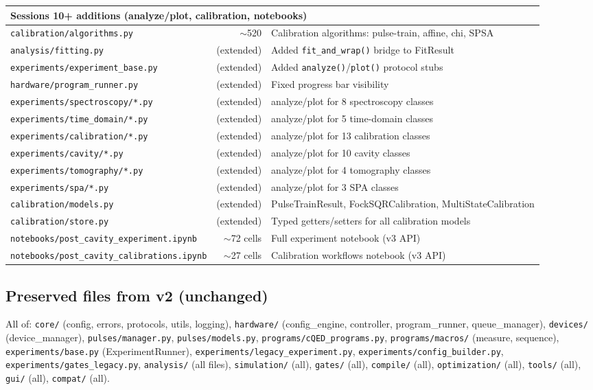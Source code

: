 \documentclass[11pt]{article}
\begin{document}
\begin{longtable}{lrl}
\midrule
\multicolumn{3}{l}{\textbf{Sessions 10+ additions (analyze/plot, calibration, notebooks)}} \\
\midrule
\texttt{calibration/algorithms.py}           & $\sim$520 & Calibration algorithms: pulse-train, affine, chi, SPSA \\
\texttt{analysis/fitting.py}                 & (extended) & Added \texttt{fit\_and\_wrap()} bridge to FitResult \\
\texttt{experiments/experiment\_base.py}     & (extended) & Added \texttt{analyze()}/\texttt{plot()} protocol stubs \\
\texttt{hardware/program\_runner.py}         & (extended) & Fixed progress bar visibility \\
\texttt{experiments/spectroscopy/*.py}       & (extended) & analyze/plot for 8 spectroscopy classes \\
\texttt{experiments/time\_domain/*.py}       & (extended) & analyze/plot for 5 time-domain classes \\
\texttt{experiments/calibration/*.py}        & (extended) & analyze/plot for 13 calibration classes \\
\texttt{experiments/cavity/*.py}             & (extended) & analyze/plot for 10 cavity classes \\
\texttt{experiments/tomography/*.py}         & (extended) & analyze/plot for 4 tomography classes \\
\texttt{experiments/spa/*.py}                & (extended) & analyze/plot for 3 SPA classes \\
\texttt{calibration/models.py}               & (extended) & PulseTrainResult, FockSQRCalibration, MultiStateCalibration \\
\texttt{calibration/store.py}                & (extended) & Typed getters/setters for all calibration models \\
\texttt{notebooks/post\_cavity\_experiment.ipynb} & $\sim$72 cells & Full experiment notebook (v3 API) \\
\texttt{notebooks/post\_cavity\_calibrations.ipynb} & $\sim$27 cells & Calibration workflows notebook (v3 API) \\
\bottomrule
\end{longtable}

\subsection{Preserved files from v2 (unchanged)}

All of:
\texttt{core/} (config, errors, protocols, utils, logging),
\texttt{hardware/} (config\_engine, controller, program\_runner, queue\_manager),
\texttt{devices/} (device\_manager),
\texttt{pulses/manager.py}, \texttt{pulses/models.py},
\texttt{programs/cQED\_programs.py}, \texttt{programs/macros/} (measure, sequence),
\texttt{experiments/base.py} (ExperimentRunner), \texttt{experiments/legacy\_experiment.py},
\texttt{experiments/config\_builder.py}, \texttt{experiments/gates\_legacy.py},
\texttt{analysis/} (all files), \texttt{simulation/} (all), \texttt{gates/} (all),
\texttt{compile/} (all), \texttt{optimization/} (all), \texttt{tools/} (all),
\texttt{gui/} (all), \texttt{compat/} (all).
\end{document}
